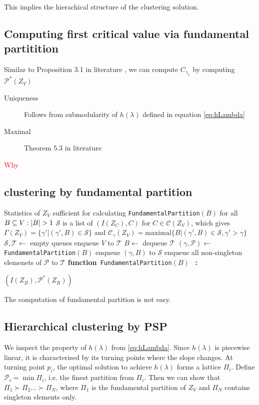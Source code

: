 \documentclass{article}
\makeatletter
\def\P{\mathcal{P}}
\DeclarePairedDelimiter\abs{\lvert}{\rvert}
\def\red#1{\textcolor{red}{#1}}
\newcommand{\algorithmicfunction}{\textbf{function}}
\newcommand{\algorithmicendfunction}{\algorithmicend\ \algorithmicfunction}
\newenvironment{ALC@func}{\begin{ALC@g}}{\end{ALC@g}}
\newcommand{\FUNCTION}[2][default]{\ALC@it\algorithmicfunction\ #2\ %
\textbf{:}%
\ALC@com{#1}\begin{ALC@func}}
\newcommand{\ENDFUNCTION}{\end{ALC@func}}
\newcommand{\ENDFUNCTION}{\end{ALC@func}\ALC@it\algorithmicendfunction}
\theoremstyle{definition}
\makeatother
\begin{document}
This implies the hierachical structure of the clustering solution.
\subsection{Computing first critical value via fundamental partitition}
Similar to Proposition 3.1 in literature \cite{ic}, we can compute $C_{\gamma_1}$ by computing $\P^*(Z_V)$
\begin{description}
\item[Uniqueness] Follows from submodularity of  $h(\lambda)$ defined in equation \eqref{eq:hLambda}
\item[Maximal] Theorem 5.3 in literature \cite{ska}
\end{description}
\red{Why}

\subsection{clustering by fundamental partition}
\begin{algorithm}
\begin{algorithmic}[1]
\REQUIRE Statistics of $Z_V$ sufficient for calculating \texttt{FundamentalPartition}$(B)$ for all $B \subseteq V:\abs{B}>1$
\ENSURE $\mathcal{S}$ is a list of $(I(Z_C),C)$ for $ C \in \mathcal{C}(Z_V)$, which gives
$\Gamma(Z_V) = \{ \gamma' | (\gamma', B) \in \mathcal{S}\} $ and $ \mathcal{C}_{\gamma}(Z_V)
= \mathrm{maximal}\{B | (\gamma', B) \in \mathcal{S}, \gamma' > \gamma \}$
\STATE $\mathcal{S},\mathcal{T} \leftarrow$ empty queues
\STATE enqueue $V$ to $\mathcal{T}$
\STATE $B \leftarrow $ dequeue $\mathcal{T}$
\STATE $(\gamma, \P) \leftarrow$\texttt{FundamentalPartition}$(B)$
\STATE enqueue $(\gamma, B)$ to $\mathcal{S}$
\STATE enqueue all non-singleton elemenets of $\P$ to $\mathcal{T}$
\ENDWHILE
\FUNCTION{\texttt{FundamentalPartition}$(B)$}
  \RETURN $(I(Z_B), \P^*(Z_B))$
\ENDFUNCTION
\end{algorithmic}
\end{algorithm}

The computation of fundamental partition is not easy.
\subsection{Hierarchical clustering by PSP}
We inspect the property of $h(\lambda)$ from \eqref{eq:hLambda}. Since $h(\lambda)$ is piecewise linear, it is characterised by its turning points where the slope changes.
At turning point $p_i$, the optimal solution to achieve $h(\lambda)$ forms a lattice $\Pi_i$.
Define $\mathcal{P}_i = \min \Pi_i$, i.e. the finest partition from $\Pi_i$. Then we can show that
$\Pi_1 \succ \Pi_2 \dots \succ \Pi_N$, where $\Pi_1$ is the fundamental partition of $Z_V$ and $\Pi_N$ contains singleton elements only.
\end{document}
